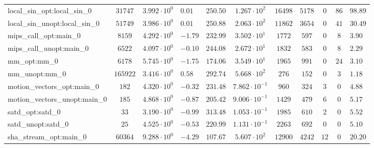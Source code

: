 \begin{tabular}{|l|c|HHc|c|c|c|c|cH|}
local\_sin\_opt:local\_sin\_0                   & $ 31747    $ & $ 3.992 \cdot 10^{0} $ & $ 0.01  $ & $ 250.50 $ & $ 1.267 \cdot 10^{2}  $ & $ 16498  $ & $ 5178  $ & $ 0   $ & $ 86  $ & $ 98.89   $ \\
local\_sin\_unopt:local\_sin\_0                 & $ 51749    $ & $ 3.986 \cdot 10^{0} $ & $ 0.01  $ & $ 250.88 $ & $ 2.063 \cdot 10^{2}  $ & $ 11862  $ & $ 3654  $ & $ 0   $ & $ 41  $ & $ 30.49   $ \\
mips\_call\_opt:main\_0                         & $ 8159     $ & $ 4.292 \cdot 10^{0} $ & $ -1.79 $ & $ 232.99 $ & $ 3.502 \cdot 10^{1}  $ & $ 1772   $ & $ 597   $ & $ 0   $ & $ 8   $ & $ 3.90    $ \\
mips\_call\_unopt:main\_0                       & $ 6522     $ & $ 4.097 \cdot 10^{0} $ & $ -0.10 $ & $ 244.08 $ & $ 2.672 \cdot 10^{1}  $ & $ 1832   $ & $ 583   $ & $ 0   $ & $ 8   $ & $ 2.29    $ \\
mm\_opt:mm\_0                                   & $ 6178     $ & $ 5.745 \cdot 10^{0} $ & $ -1.75 $ & $ 174.06 $ & $ 3.549 \cdot 10^{1}  $ & $ 1965   $ & $ 991   $ & $ 0   $ & $ 24  $ & $ 3.10    $ \\
mm\_unopt:mm\_0                                 & $ 165922   $ & $ 3.416 \cdot 10^{0} $ & $ 0.58  $ & $ 292.74 $ & $ 5.668 \cdot 10^{2}  $ & $ 276    $ & $ 152   $ & $ 0   $ & $ 3   $ & $ 1.18    $ \\
motion\_vectors\_opt:main\_0                    & $ 182      $ & $ 4.320 \cdot 10^{0} $ & $ -0.32 $ & $ 231.48 $ & $ 7.862 \cdot 10^{-1} $ & $ 960    $ & $ 324   $ & $ 3   $ & $ 0   $ & $ 4.88    $ \\
motion\_vectors\_unopt:main\_0                  & $ 185      $ & $ 4.868 \cdot 10^{0} $ & $ -0.87 $ & $ 205.42 $ & $ 9.006 \cdot 10^{-1} $ & $ 1429   $ & $ 479   $ & $ 6   $ & $ 0   $ & $ 5.17    $ \\
satd\_opt:satd\_0                               & $ 33       $ & $ 3.190 \cdot 10^{0} $ & $ -0.99 $ & $ 313.48 $ & $ 1.053 \cdot 10^{-1} $ & $ 1985   $ & $ 610   $ & $ 2   $ & $ 0   $ & $ 5.52    $ \\
satd\_unopt:satd\_0                             & $ 25       $ & $ 4.525 \cdot 10^{0} $ & $ -0.53 $ & $ 220.99 $ & $ 1.131 \cdot 10^{-1} $ & $ 2263   $ & $ 692   $ & $ 0   $ & $ 0   $ & $ 5.10    $ \\
sha\_stream\_opt:main\_0                        & $ 60364    $ & $ 9.288 \cdot 10^{0} $ & $ -4.29 $ & $ 107.67 $ & $ 5.607 \cdot 10^{2}  $ & $ 12900  $ & $ 4242  $ & $ 12  $ & $ 0   $ & $ 20.20   $ \\

\end{tabular}
